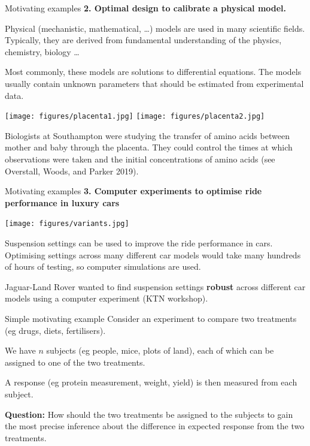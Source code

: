 \documentclass[
  ignorenonframetext,
]{beamer}
\begin{document}
\begin{frame}{Motivating examples}
\protect\hypertarget{motivating-examples-1}{}
\textbf{2. Optimal design to calibrate a physical model.}

Physical (mechanistic, mathematical, \ldots) models are used in many
scientific fields. Typically, they are derived from fundamental
understanding of the physics, chemistry, biology \ldots{}

Most commonly, these models are solutions to differential equations. The
models usually contain unknown parameters that should be estimated from
experimental data.

\texttt{[image: figures/placenta1.jpg]}
\texttt{[image: figures/placenta2.jpg]}

Biologists at Southampton were studying the transfer of amino acids
between mother and baby through the placenta. They could control the
times at which observations were taken and the initial concentrations of
amino acids (see Overstall, Woods, and Parker 2019).
\end{frame}

\begin{frame}{Motivating examples}
\protect\hypertarget{motivating-examples-2}{}
\textbf{3. Computer experiments to optimise ride performance in luxury
cars}

\texttt{[image: figures/variants.jpg]}

Suspension settings can be used to improve the ride performance in cars.
Optimising settings across many different car models would take many
hundreds of hours of testing, so computer simulations are used.

Jaguar-Land Rover wanted to find suspension settings \textbf{robust}
across different car models using a computer experiment (KTN workshop).
\end{frame}

\begin{frame}{Simple motivating example}
\protect\hypertarget{simple-motivating-example}{}
Consider an experiment to compare two treatments (eg drugs, diets,
fertilisers).

We have \(n\) subjects (eg people, mice, plots of land), each of which
can be assigned to one of the two treatments.

A response (eg protein measurement, weight, yield) is then measured from
each subject.

\textbf{Question:} How should the two treatments be assigned to the
subjects to gain the most precise inference about the difference in
expected response from the two treatments.
\end{frame}
\end{document}
